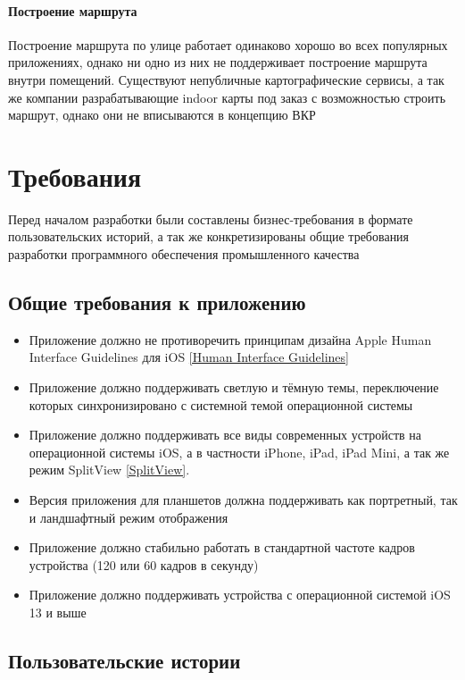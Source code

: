     \subsubsection{Построение маршрута}
      Построение маршрута по улице работает одинаково хорошо во всех популярных приложениях, однако ни одно из них не поддерживает построение маршрута внутри помещений. Существуют непубличные картографические сервисы, а так же компании разрабатывающие indoor карты под заказ с возможностью строить маршрут, однако они не вписываются в концепцию ВКР


\chapter{Требования}
  Перед началом разработки были составлены бизнес-требования в формате пользовательских историй, а так же конкретизированы общие требования разработки программного обеспечения промышленного качества

  \section{Общие требования к приложению}
    \begin{itemize}
      \item Приложение должно не противоречить принципам дизайна Apple Human Interface Guidelines для iOS \ref{Human Interface Guidelines}
      \item Приложение должно поддерживать светлую и тёмную темы, переключение которых синхронизировано с системной темой операционной системы
      \item Приложение должно поддерживать все виды современных устройств на операционной системы iOS, а в частности iPhone, iPad, iPad Mini, а так же режим SplitView \ref{SplitView}.
      \item Версия приложения для планшетов должна поддерживать как портретный, так и ландшафтный режим отображения
      \item Приложение должно стабильно работать в стандартной частоте кадров устройства (120 или 60 кадров в секунду)
      \item Приложение должно поддерживать устройства с операционной системой iOS 13 и выше
    \end{itemize}

  \section{Пользовательские истории}
